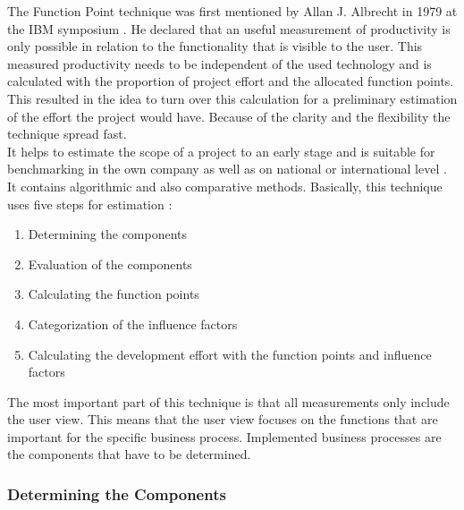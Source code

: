 The Function Point technique was first mentioned by Allan J. Albrecht in 1979 at the IBM symposium \cite{albrecht}. He declared that an useful measurement of productivity is only possible in relation to the functionality that is visible to the user. This measured productivity needs to be independent of the used technology and is calculated with the proportion of project effort and the allocated function points.\\
This resulted in the idea to turn over this calculation for a preliminary estimation of the effort the project would have. Because of the clarity and the flexibility the technique spread fast. \\
It helps to estimate the scope of a project to an early stage and is suitable for benchmarking in the own company as well as on national or international level \cite{FPKompakt}. It contains algorithmic and also comparative methods. Basically, this technique uses five steps for estimation \cite{jenny}:
\begin{enumerate}
	\item Determining the components
	\item Evaluation of the components
	\item Calculating the function points
	\item Categorization of the influence factors
	\item Calculating the development effort with the function points and influence factors
\end{enumerate}
The most important part of this technique is that all measurements only include the user view. This means that the user view focuses on the functions that are important for the specific business process. Implemented business processes are the components that have to be determined.

\subsubsection{Determining the Components}\label{fpcomponents}

